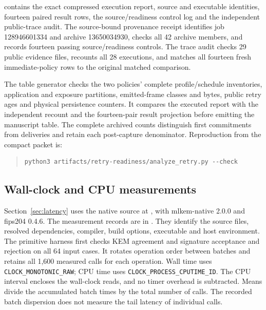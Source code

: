 \documentclass[pdflatex]{sn-jnl}
\theoremstyle{thmstyleone}
\theoremstyle{thmstylethree}
\theoremstyle{thmstyletwo}
\begin{document}
 contains the exact compressed execution
report, source and executable identities, fourteen paired result rows, the
source/readiness control log and the independent public-trace audit. The
source-bound provenance receipt identifies job 128946601334 and archive
13650034930, checks all 42 archive members, and records fourteen passing
source/readiness controls. The trace audit checks 29 public evidence files,
recounts all 28 executions, and matches all fourteen fresh immediate-policy
rows to the original matched comparison.

The table generator checks the two policies' complete profile/schedule
inventories, application and exposure partitions, emitted-frame classes and
bytes, public retry ages and physical persistence counters. It compares the
executed report with the independent recount and the fourteen-pair result
projection before emitting the manuscript table. The complete archived
counts distinguish first commitments from deliveries and retain each
post-capture denominator. Reproduction from the compact packet is:
\begin{quote}
\small
\begin{verbatim}
python3 artifacts/retry-readiness/analyze_retry.py --check
\end{verbatim}
\end{quote}

\subsection{Wall-clock and CPU measurements}
\label{app:latency}

Section~\ref{sec:latency} uses the native source at
, with mlkem-native 2.0.0 and
fips204 0.4.6. The measurement records are in
. They identify the source files, resolved
dependencies, compiler, build options, executable and host environment.
The primitive harness first checks KEM agreement and signature acceptance
and rejection on all 64 input cases. It rotates operation order between
batches and retains all 1,600 measured calls for each operation.
Wall time uses \texttt{CLOCK\_MONOTONIC\_RAW}; CPU time uses
\texttt{CLOCK\_PROCESS\_CPUTIME\_ID}. The CPU interval encloses the wall-clock
reads, and no timer overhead is subtracted. Means divide the accumulated
batch times by the total number of calls. The recorded batch dispersion
does not measure the tail latency of individual calls.
\end{document}
